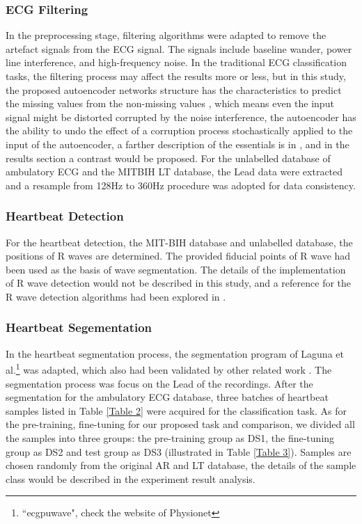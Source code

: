 \documentclass[journal]{IEEEtran}
\begin{document}
\subsubsection{ECG Filtering}
In the preprocessing stage, filtering algorithms were adapted to remove the artefact signals from the ECG signal. The signals include baseline wander, power line interference, and high-frequency noise. In the traditional ECG classification tasks, the filtering process may affect the results more or less, but in this study, the proposed autoencoder networks structure has the characteristics to predict the missing values from the non-missing values \cite{bengio2009}, which means even the input signal might be distorted corrupted by the noise interference, the autoencoder has the ability to undo the effect of a corruption process stochastically applied to the input of the autoencoder, a farther description of the essentials is in \cite{vincent}, and in the results section a contrast would be proposed. For the unlabelled database of ambulatory ECG and the MITBIH LT database, the Lead \uppercase\expandafter{} data were extracted and a resample from 128Hz to 360Hz procedure was adopted for data consistency.

\subsubsection{Heartbeat Detection}
For the heartbeat detection, the MIT-BIH database and unlabelled database, the positions of R waves are determined. The provided fiducial points of R wave had been used as the basis of wave segmentation. The details of the implementation of R wave detection would not be described in this study, and a reference for the R wave detection algorithms had been explored in \cite{afonso}.

\subsubsection{Heartbeat Segementation}
In the heartbeat segmentation process, the segmentation program of Laguna et al.\footnote{``ecgpuwave", check the website of Physionet} was adapted, which also had been validated by other related work \cite{chaza}. The segmentation process was focus on the  Lead \uppercase\expandafter{} of the recordings. After the segmentation for the ambulatory ECG database, three batches of heartbeat samples listed in Table \ref{Table 2} were acquired for the classification task. As for the pre-training, fine-tuning for our proposed task and comparison, we divided all the samples into three groups: the pre-training group as DS1, the fine-tuning group as DS2 and test group as DS3 (illustrated in Table \ref{Table 3}). Samples are chosen randomly from the original AR and LT database, the details of the sample class would be described in the experiment result analysis.
\end{document}
